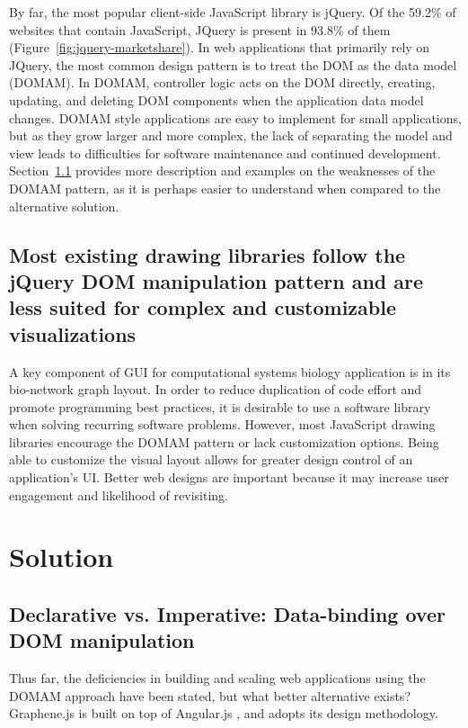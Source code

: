 By far, the most popular client-side JavaScript library is jQuery. \autocite{w3techs2014javascript}
Of the 59.2\% of websites that contain JavaScript, JQuery is present in 93.8\% of them (Figure~\ref{fig:jquery-marketshare}).
In web applications that primarily rely on JQuery, the most common design pattern is to treat the DOM as the data model (DOMAM).
In DOMAM, controller logic acts on the DOM directly, creating, updating, and deleting DOM components when the application data model changes.
DOMAM style applications are easy to implement for small applications, but as they grow larger and more complex, the lack of separating the model and view leads to difficulties for software maintenance and continued development.
Section~\ref{sec:declarative-vs-imperative} provides more description and examples on the weaknesses of the DOMAM pattern, as it is perhaps easier to understand when compared to the alternative solution.

\subsection{Most existing drawing libraries follow the jQuery DOM manipulation pattern and are less suited for complex and customizable visualizations}
A key component of GUI for computational systems biology application is in its bio-network graph layout.
In order to reduce duplication of code effort and promote programming best practices, it is desirable to use a software library when solving recurring software problems.
However, most JavaScript drawing libraries encourage the DOMAM pattern or lack customization options.
Being able to customize the visual layout allows for greater design control of an application's UI. 
Better web designs are important because it may increase user engagement and likelihood of revisiting. \autocite{rosen2004website}

\section{Solution}

\subsection{Declarative vs. Imperative: Data-binding over DOM manipulation}
\label{sec:declarative-vs-imperative}

Thus far, the deficiencies in building and scaling web applications using the DOMAM approach have been stated, but what better alternative exists?
Graphene.js is built on top of Angular.js \autocite{google2014angular}, and adopts its design methodology.

